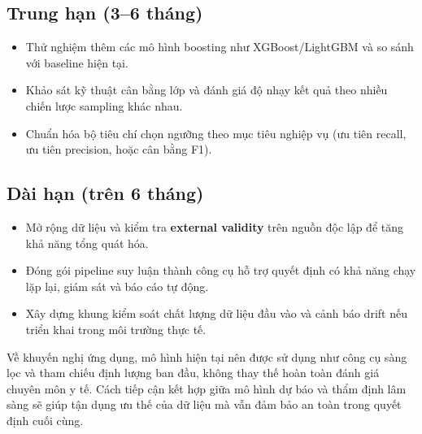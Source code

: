 \subsection{Trung hạn (3--6 tháng)}
\begin{itemize}[leftmargin=1.5em]
    \item Thử nghiệm thêm các mô hình boosting như XGBoost/LightGBM và so sánh với baseline hiện tại.
    \item Khảo sát kỹ thuật cân bằng lớp và đánh giá độ nhạy kết quả theo nhiều chiến lược sampling khác nhau.
    \item Chuẩn hóa bộ tiêu chí chọn ngưỡng theo mục tiêu nghiệp vụ (ưu tiên recall, ưu tiên precision, hoặc cân bằng F1).
\end{itemize}

\subsection{Dài hạn (trên 6 tháng)}
\begin{itemize}[leftmargin=1.5em]
    \item Mở rộng dữ liệu và kiểm tra \textbf{external validity} trên nguồn độc lập để tăng khả năng tổng quát hóa.
    \item Đóng gói pipeline suy luận thành công cụ hỗ trợ quyết định có khả năng chạy lặp lại, giám sát và báo cáo tự động.
    \item Xây dựng khung kiểm soát chất lượng dữ liệu đầu vào và cảnh báo drift nếu triển khai trong môi trường thực tế.
\end{itemize}

\noindent
Về khuyến nghị ứng dụng, mô hình hiện tại nên được sử dụng như công cụ sàng lọc và tham chiếu định lượng ban đầu,
không thay thế hoàn toàn đánh giá chuyên môn y tế. Cách tiếp cận kết hợp giữa mô hình dự báo và thẩm định lâm sàng
sẽ giúp tận dụng ưu thế của dữ liệu mà vẫn đảm bảo an toàn trong quyết định cuối cùng.
